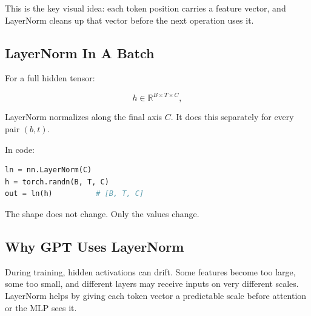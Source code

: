 This is the key visual idea: each token position carries a feature vector, and LayerNorm cleans up that vector before the next operation uses it.

\subsection{LayerNorm In A Batch}

For a full hidden tensor:

\[
h \in \mathbb{R}^{B \times T \times C},
\]

LayerNorm normalizes along the final axis \(C\). It does this separately for every pair \((b,t)\).

\begin{center}
\end{center}

In code:

\begin{lstlisting}[language=Python]
ln = nn.LayerNorm(C)
h = torch.randn(B, T, C)
out = ln(h)          # [B, T, C]
\end{lstlisting}

The shape does not change. Only the values change.

\subsection{Why GPT Uses LayerNorm}

During training, hidden activations can drift. Some features become too large, some too small, and different layers may receive inputs on very different scales. LayerNorm helps by giving each token vector a predictable scale before attention or the MLP sees it.

